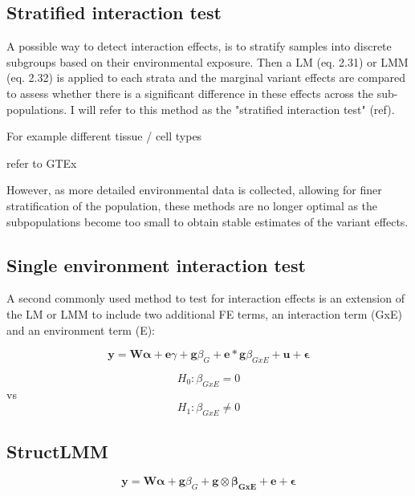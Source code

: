 \subsection{Stratified interaction test}

A possible way to detect interaction effects, is to stratify samples into discrete subgroups based on their environmental exposure.
Then a LM (eq. 2.31) or LMM (eq. 2.32) is applied to each strata and the marginal variant effects are compared to assess whether there is a significant difference in these effects across the sub-populations.
I will refer to this method as the "stratified interaction test" (ref).

For example different tissue / cell types

refer to GTEx

However, as more detailed environmental data is collected, allowing for finer stratification of the population, these methods are no longer optimal as the subpopulations become too small to obtain stable estimates of the variant effects.

\subsection{Single environment interaction test}

A second commonly used method to test for interaction effects is an extension of the LM or LMM to include two additional FE terms, an interaction term (GxE) and an environment term (E):

\begin{equation}\label{eq22:Interaction_test_FE_LMM}
 \mathbf{y} =  \mathbf{W}\boldsymbol{\alpha} + \mathbf{e}\gamma  + \mathbf{g}\beta_G + \mathbf{e}*\mathbf{g}\beta_{GxE} + \mathbf{u} + \boldsymbol{\epsilon} 
\end{equation}

\begin{equation}
 H_{0}: \beta_{GxE}=0 
\end{equation}
vs
\begin{equation}
 H_{1}: \beta_{GxE} \neq 0 
\end{equation}

\newpage

\subsection{StructLMM}

\begin{equation}\label{eq23:StructLMM-int}
 \mathbf{y} =  \mathbf{W}\boldsymbol{\alpha} + \mathbf{g}\beta_G + \mathbf{g} \otimes \boldsymbol{\beta_{GxE}} + \mathbf{e} + \boldsymbol{\epsilon} 
\end{equation}

